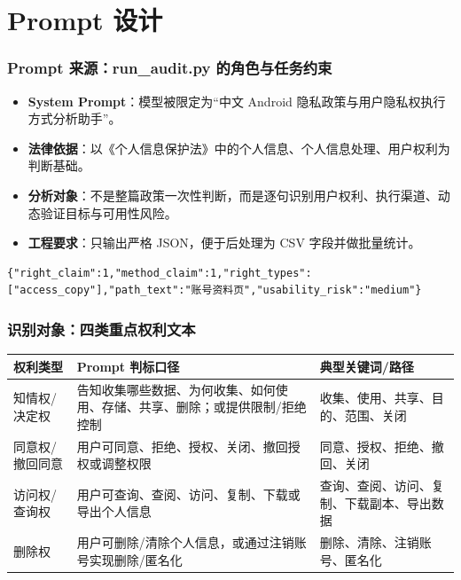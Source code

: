 \documentclass[AutoFakeBold,AutoFakeSlant]{beamer}
\begin{document}
\section{Prompt 设计}

\begin{frame}[fragile]
    \frametitle{Prompt 来源：run\_audit.py 的角色与任务约束}
    \small
    \begin{itemize}
        \item \textbf{System Prompt}：模型被限定为“中文 Android 隐私政策与用户隐私权执行方式分析助手”。
        \item \textbf{法律依据}：以《个人信息保护法》中的个人信息、个人信息处理、用户权利为判断基础。
        \item \textbf{分析对象}：不是整篇政策一次性判断，而是逐句识别用户权利、执行渠道、动态验证目标与可用性风险。
        \item \textbf{工程要求}：只输出严格 JSON，便于后处理为 CSV 字段并做批量统计。
    \end{itemize}
    \vspace{0.3em}
    \begin{lstlisting}
{"right_claim":1,"method_claim":1,"right_types":["access_copy"],"path_text":"账号资料页","usability_risk":"medium"}
    \end{lstlisting}
\end{frame}

\begin{frame}
    \frametitle{识别对象：四类重点权利文本}
    \small
    \begin{tabularx}{\textwidth}{|p{}|X|p{}|}
        \toprule
        \textbf{权利类型} & \textbf{Prompt 判标口径} & \textbf{典型关键词/路径} \\
        \midrule
        知情权/决定权 & 告知收集哪些数据、为何收集、如何使用、存储、共享、删除；或提供限制/拒绝控制 & 收集、使用、共享、目的、范围、关闭 \\
        \midrule
        同意权/撤回同意 & 用户可同意、拒绝、授权、关闭、撤回授权或调整权限 & 同意、授权、拒绝、撤回、关闭 \\
        \midrule
        访问权/查询权 & 用户可查询、查阅、访问、复制、下载或导出个人信息 & 查询、查阅、访问、复制、下载副本、导出数据 \\
        \midrule
        删除权 & 用户可删除/清除个人信息，或通过注销账号实现删除/匿名化 & 删除、清除、注销账号、匿名化 \\
        \bottomrule
    \end{tabularx}
\end{frame}
\end{document}
